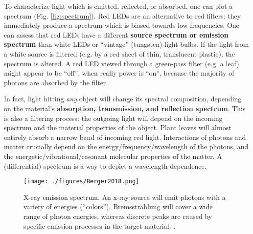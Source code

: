 To characterize light which is emitted, reflected, or absorbed, one can plot a spectrum (Fig. \ref{fig:spectrum}).
Red LEDs are an alternative to red filters: they immediately produce a spectrum which is biased towards low frequencies.
One can assess that red LEDs have a different \textbf{source spectrum or emission spectrum} than white LEDs or ``vintage'' (tungsten) light bulbs.
If the light from a white source is filtered (e.g. by a red sheet of thin, translucent plastic), the spectrum is altered.
A red LED viewed through a green-pass filter (e.g. a leaf) might appear to be ``off'', when really power is ``on'', because the majority of photons are absorbed by the filter.

In fact, light hitting \emph{any} object will change its spectral composition, depending on the material's \textbf{absorption, transmission, and reflection spectrum}.
This is also a filtering process: the outgoing light will depend on the incoming spectrum and the material properties of the object.
Plant leaves will almost entirely absorb a narrow band of incoming red light.
Interactions of photons and matter crucially depend on the energy/frequency/wavelength of the photons, and the energetic/vibrational/resonant molecular properties of the matter.
A (differential) spectrum is a way to depict a wavelength dependence.


\begin{figure}[p]
\centering
\texttt{[image: ./figures/Berger2018.png]}
\caption{\label{fig:xray_emission}X-ray emission spectrum. An x-ray source will emit photons with a variety of energies (``colors''). Bremsstrahlung will cover a wide range of photon energies, whereas discrete peaks are caused by specific emission processes in the target material. \citep[taken from ][creative commons license]{Berger2018fig8}.}
\end{figure}

